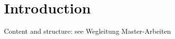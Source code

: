 \chapter{Introduction}\label{Einleitung}
\thispagestyle{empty} 

Content and structure: see Wegleitung Master-Arbeiten

\cleardoublepage 